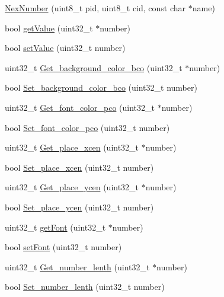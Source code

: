 \begin{DoxyCompactItemize}
\item 
\hyperlink{class_nex_number_a59c2ed35b787f498e7fbc54eff71d00b}{Nex\+Number} (uint8\+\_\+t pid, uint8\+\_\+t cid, const char $\ast$name)
\item 
bool \hyperlink{class_nex_number_ad184ed818666ec482efddf840185c7b8}{get\+Value} (uint32\+\_\+t $\ast$number)
\item 
bool \hyperlink{class_nex_number_a9cef51f6b76b4ba03a31b2427ffd4526}{set\+Value} (uint32\+\_\+t number)
\item 
uint32\+\_\+t \hyperlink{class_nex_number_aa7ef40e79d89eb0aeebbeb67147a0d20}{Get\+\_\+background\+\_\+color\+\_\+bco} (uint32\+\_\+t $\ast$number)
\item 
bool \hyperlink{class_nex_number_a8168c315e57d9aec3b61ed4febaa6663}{Set\+\_\+background\+\_\+color\+\_\+bco} (uint32\+\_\+t number)
\item 
uint32\+\_\+t \hyperlink{class_nex_number_a7eb3fba2bfa2fff8df8e7e0f633f9cf9}{Get\+\_\+font\+\_\+color\+\_\+pco} (uint32\+\_\+t $\ast$number)
\item 
bool \hyperlink{class_nex_number_ab1836d2d570fca4cd707acecc4b67dea}{Set\+\_\+font\+\_\+color\+\_\+pco} (uint32\+\_\+t number)
\item 
uint32\+\_\+t \hyperlink{class_nex_number_a7ca05534f06911218bae6606ccc355fa}{Get\+\_\+place\+\_\+xcen} (uint32\+\_\+t $\ast$number)
\item 
bool \hyperlink{class_nex_number_a5e58200c740340cc2666e61b6c80e891}{Set\+\_\+place\+\_\+xcen} (uint32\+\_\+t number)
\item 
uint32\+\_\+t \hyperlink{class_nex_number_ac8f0cef0d04e72bb864f6da88f028c9f}{Get\+\_\+place\+\_\+ycen} (uint32\+\_\+t $\ast$number)
\item 
bool \hyperlink{class_nex_number_a05aa6572aabe07b48c1b0675904aaadd}{Set\+\_\+place\+\_\+ycen} (uint32\+\_\+t number)
\item 
uint32\+\_\+t \hyperlink{class_nex_number_a8ccd35555397e828cf8b1f0a8e9ba294}{get\+Font} (uint32\+\_\+t $\ast$number)
\item 
bool \hyperlink{class_nex_number_aed567aef79411c5457c81be272218439}{set\+Font} (uint32\+\_\+t number)
\item 
uint32\+\_\+t \hyperlink{class_nex_number_a0dfc73db91229f114e502bc14084e711}{Get\+\_\+number\+\_\+lenth} (uint32\+\_\+t $\ast$number)
\item 
bool \hyperlink{class_nex_number_a045519a466875775d561e54176c459ad}{Set\+\_\+number\+\_\+lenth} (uint32\+\_\+t number)

\end{DoxyCompactItemize}
